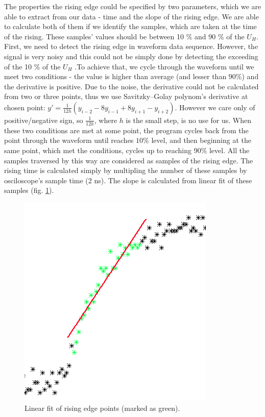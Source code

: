 \par
The properties the rising edge could be specified by two parameters, which we are able to extract from our data - time and the slope of the rising edge. We are able to calculate both of them if we identify the samples, which are taken at the time of the rising. These samples' values should be between 10 $\%$ and 90 $\%$ of the $U_{H}$. First, we need to detect the rising edge in waveform data sequence. However, the signal is very noisy and this could not be simply done by detecting the exceeding of the 10 $\%$ of the $U_{H}$ .To achieve that, we cycle through the waveform until we meet two conditions - the value is higher than average (and lesser than $90 \%$) and the derivative is positive. Due to the noise, the derivative could not be calculated from two or three points, thus we use Savitzky–Golay polynom's derivative at chosen point: $y' = \frac{1}{12h}(y_{i-2} -8y_{i-1} + 8y_{i+1} - y_{i+2}) $. However we care only of positive/negative sign, so $\frac{1}{12h}$, where $h$ is the small step, is no use for us. When these two conditions are met at some point, the program cycles back from the point through the waveform until reaches $10\%$ level, and then beginning at the same point, which met the conditions, cycles up to reaching $90\%$ level. All the samples traversed by this way are considered as samples of the rising edge. The rising time is calculated simply by multipling the number of these samples by osciloscope's sample time (2 ns). The slope is calculated from linear fit of these samples (fig. \ref{linfit}).  


 \begin{figure}[H]
 \centering
 \includegraphics[scale=0.65]{./pictures/linFit}
 \caption{Linear fit of rising edge points (marked as green).}
 \label{linfit}
\end{figure}


